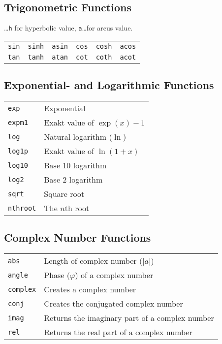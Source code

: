 \subsection{Trigonometric Functions}
\dots \texttt{h} for hyperbolic value, \texttt{a}\dots for arcus value. 
\begin{tabular}{ccc|ccc}
  \texttt{sin} & \texttt{sinh} & \texttt{asin} & \texttt{cos} & \texttt{cosh} & \texttt{acos} \\
  \texttt{tan} & \texttt{tanh} & \texttt{atan} & \texttt{cot} & \texttt{coth} & \texttt{acot} \\
\end{tabular}

\subsection{Exponential- and Logarithmic Functions}
\begin{tabular}{@{}p{\the\MyLenA}%
		@{}p{\linewidth-\the\MyLenA}}
  \texttt{exp} & Exponential\\
  \texttt{expm1}& Exakt value of $\exp(x) - 1$\\
  \texttt{log}& Natural logarithm ($\ln$)\\
  \texttt{log1p} & Exakt value of $\ln(1 + x)$\\
  \texttt{log10} & Base 10 logarithm\\
  \texttt{log2} & Base 2 logarithm\\
  \texttt{sqrt} & Square root\\
  \texttt{nthroot} & The $n$th root\\
\end{tabular}

\subsection{Complex Number Functions}
\begin{tabular}{@{}p{\the\MyLenA}%
		@{}p{\linewidth-\the\MyLenA}}
  \texttt{abs} & Length of complex number ($|a|$)\\
  \texttt{angle}& Phase ($\varphi$) of a complex number\\
  \texttt{complex}& Creates a complex number\\
  \texttt{conj} & Creates the conjugated complex number\\
  \texttt{imag} & Returns the imaginary part of a complex number\\
  \texttt{rel} & Returns the real part of a complex number\\
\end{tabular}